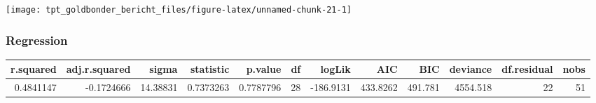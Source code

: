 \documentclass[
  paper=a4,
  ,captions=tableheading
]{scrartcl}
\begin{document}
\begin{center}\texttt{[image: tpt\_goldbonder\_bericht\_files/figure-latex/unnamed-chunk-21-1]} \end{center}

\hypertarget{regression-1}{%
\subsubsection{Regression}\label{regression-1}}

\begin{tabular}{r|r|r|r|r|r|r|r|r|r|r|r}
\hline
r.squared & adj.r.squared & sigma & statistic & p.value & df & logLik & AIC & BIC & deviance & df.residual & nobs\\
\hline
0.4841147 & -0.1724666 & 14.38831 & 0.7373263 & 0.7787796 & 28 & -186.9131 & 433.8262 & 491.781 & 4554.518 & 22 & 51\\
\hline
\end{tabular}
\end{document}
